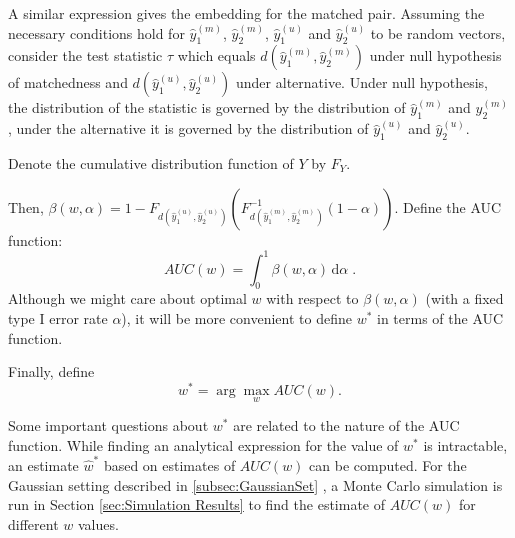 \documentclass[11pt]{article} %
\begin{document}
A similar expression gives the embedding for the matched pair.
 Assuming the necessary conditions hold for $\hat{y}_{1}^{(m)}\!$, $\hat{y}_{2}^{(m)}\!$, $\hat{y}_{1}^{(u)}\!$ and $\hat{y}_{2}^{(u)}$ to be random vectors, consider the test statistic $\tau$ which equals $d(\hat{y}_{1}^{(m)},\hat{y}_{2}^{(m)})$ under null hypothesis of matchedness and $d(\hat{y}_{1}^{(u)},\hat{y}_{2}^{(u)})$ under alternative. Under null hypothesis, the distribution of the statistic is governed by the distribution of $\hat{y}_{1}^{(m)}$ and $\hat{y}_{2}^{(m)}$, under the alternative it is governed by  the distribution of $\hat{y}_{1}^{(u)}$ and $\hat{y}_{2}^{(u)}$.

Denote  the   cumulative distribution function of  $Y$ by $F_Y$.

 Then, $\beta\left( w,\alpha\right)=1-F_{d \left(\hat{y}_{1}^{(u)},\hat{y}_{2}^{(u)}\right)}(F_{d\left(\hat{y}_{1}^{(m)},\hat{y}_{2}^{(m)}\right)}^{-1}(1-\alpha)).$
Define the AUC function:  $$AUC(w)=\int_{0}^{1}\! \beta\left( w,\alpha\right)\,\mathrm{d}\alpha \; .$$
Although we might care about optimal $w$ with respect to  $\beta\left( w,\alpha\right)$ (with a fixed type I error rate $\alpha$),  it will be more convenient to define $w^*$ in terms of the AUC function.

 Finally, define $$w^{*}=\arg\max_w{AUC\left( w\right)}. $$

 Some important questions about $w^*$ are  related to the nature of the AUC function.
While finding an analytical expression for the value of $w^*$ is intractable, an estimate $\hat{w}^*$  based on  estimates of $AUC(w)$ %
 can be computed.  For the Gaussian setting described in \ref{subsec:GaussianSet} , a Monte Carlo simulation is run in  Section  \ref{sec:Simulation Results} to find the estimate of $AUC(w)$ for different $w$ values.
\end{document}
